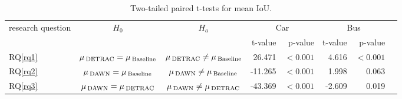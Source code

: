 \documentclass[]{article}
\begin{document}
	\begin{table}[H]
	\centering
	\begin{tabular}{lccrrrrp{1.5in}}
		\toprule
		research question & \textbf{$H_0$} & \textbf{$H_a$} &  \multicolumn{2}{c}{Car} &  \multicolumn{2}{c}{Bus}  \\
		{} & {}             & {}             & t-value  & p-value       & t-value & p-value \\
		\midrule
		RQ\ref{rq1} & $\mu\,\textsubscript{DETRAC} = \mu\,\textsubscript{Baseline}$ & $\mu\,\textsubscript{DETRAC} \neq \mu\,\textsubscript{Baseline}$ & 26.471 & $< 0.001$ & 4.616 & $< 0.001$ \\
		RQ\ref{rq2} & $\mu\,\textsubscript{DAWN} = \mu\,\textsubscript{Baseline}$   & $\mu\,\textsubscript{DAWN} \neq \mu\,\textsubscript{Baseline}$   & -11.265 & $< 0.001$ & 1.998 & 0.063  \\
		RQ\ref{rq3} & $\mu\,\textsubscript{DAWN} = \mu\,\textsubscript{DETRAC}$ & $\mu\,\textsubscript{DAWN} \neq \mu\,\textsubscript{DETRAC}$ & -43.369  & $< 0.001$ & -2.609 & 0.019 \\
		\bottomrule
	\end{tabular}
	\caption{Two-tailed paired t-tests for mean IoU.}
	\label{table:iou-t-test}
	\end{table}	     
\end{document}
